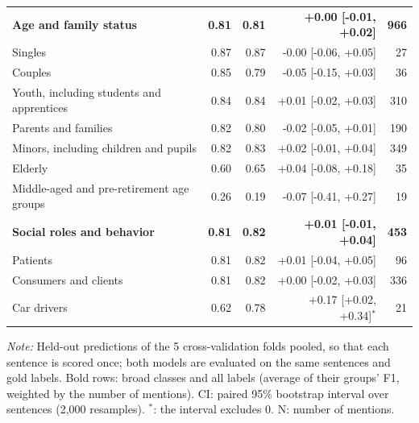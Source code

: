 \begin{table}[htbp]
\begin{threeparttable}
\begin{tabular}{l rr r r}
\addlinespace
\textbf{Age and family status} & \textbf{0.81} & \textbf{0.81} & \textbf{+0.00 [-0.01, +0.02]} & \textbf{966} \\
\quad Singles & 0.87 & 0.87 & -0.00 [-0.06, +0.05] & 27 \\
\quad Couples & 0.85 & 0.79 & -0.05 [-0.15, +0.03] & 36 \\
\quad Youth, including students and apprentices & 0.84 & 0.84 & +0.01 [-0.02, +0.03] & 310 \\
\quad Parents and families & 0.82 & 0.80 & -0.02 [-0.05, +0.01] & 190 \\
\quad Minors, including children and pupils & 0.82 & 0.83 & +0.02 [-0.01, +0.04] & 349 \\
\quad Elderly & 0.60 & 0.65 & +0.04 [-0.08, +0.18] & 35 \\
\quad Middle-aged and pre-retirement age groups & 0.26 & 0.19 & -0.07 [-0.41, +0.27] & 19 \\
\addlinespace
\textbf{Social roles and behavior} & \textbf{0.81} & \textbf{0.82} & \textbf{+0.01 [-0.01, +0.04]} & \textbf{453} \\
\quad Patients & 0.81 & 0.82 & +0.01 [-0.04, +0.05] & 96 \\
\quad Consumers and clients & 0.81 & 0.82 & +0.00 [-0.02, +0.03] & 336 \\
\quad Car drivers & 0.62 & 0.78 & +0.17 [+0.02, +0.34]$^{*}$ & 21 \\
\bottomrule
\end{tabular}
\begin{tablenotes}[flushleft]
\footnotesize
\item \textit{Note:} Held-out predictions of the 5 cross-validation folds pooled, so that each sentence is scored once; both models are evaluated on the same sentences and gold labels. Bold rows: broad classes and all labels (average of their groups' F1, weighted by the number of mentions). CI: paired 95\% bootstrap interval over sentences (2,000 resamples). $^{*}$: the interval excludes 0. N: number of mentions.
\end{tablenotes}
\end{threeparttable}
\end{table}
